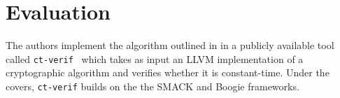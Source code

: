 \section{Evaluation}
\label{results}

The authors implement the algorithm outlined in  in a publicly available tool called \texttt{ct-verif}~\cite{ct-verif-github} which takes as input an LLVM implementation of a cryptographic algorithm and verifies whether it is constant-time. 
Under the covers, \texttt{ct-verif} builds on the the SMACK and Boogie frameworks.
